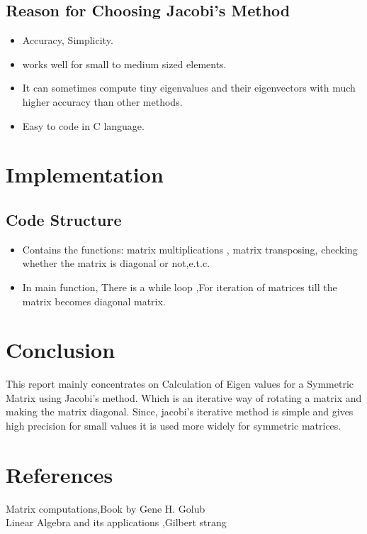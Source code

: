 \documentclass[12pt]{article}
\begin{document}
\subsection{Reason for Choosing Jacobi's Method}
\begin{itemize}
   \item Accuracy, Simplicity.
   \item works well for small to medium sized elements.
    \item  It can sometimes compute tiny eigenvalues and their
eigenvectors with much higher accuracy than other methods. 
   \item Easy to code in C language.
\end{itemize}

\section{Implementation}
       \subsection{Code Structure}
       \begin{itemize}
           \item Contains the functions: matrix multiplications , matrix transposing, checking whether the matrix is diagonal or not,e.t.c.
           \item  In main function, There is a while loop ,For iteration of matrices till the matrix becomes diagonal matrix. 
       \end{itemize}
        
       
\section{Conclusion}
 This report mainly concentrates on Calculation of Eigen values for a Symmetric Matrix using Jacobi's method. Which is an iterative way of rotating a matrix and making the matrix diagonal. Since, jacobi's iterative method is simple and gives high precision for small values it is used more widely for symmetric matrices. 
\section{References}
    Matrix computations,Book by Gene H. Golub\\
    Linear Algebra and its applications ,Gilbert strang
\end{document}
